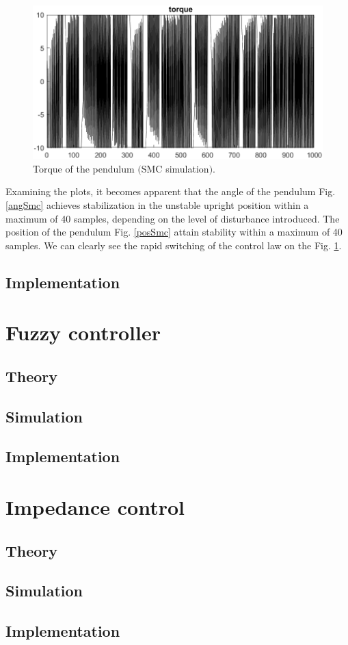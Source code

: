 \begin{figure}[!tbh]
	\centering
	\includegraphics[width=150mm]{obr/torSmc.png}
	\caption{Torque of the pendulum $($SMC simulation$)$.}\label{torSmc}
\end{figure}

Examining the plots, it becomes apparent that the angle of the pendulum Fig. \ref{angSmc} achieves stabilization in the unstable upright position within a maximum of 40 samples, depending on the level of disturbance introduced. The position of the pendulum Fig. \ref{posSmc} attain stability within a maximum of 40 samples. We can clearly see the rapid switching of the control law on the Fig. \ref{torSmc}. 

\subsection{Implementation}

\newpage
\section{Fuzzy controller}
\subsection{Theory}
\subsection{Simulation}
\subsection{Implementation}

\newpage
\section{Impedance control}
\subsection{Theory}
\subsection{Simulation}
\subsection{Implementation}